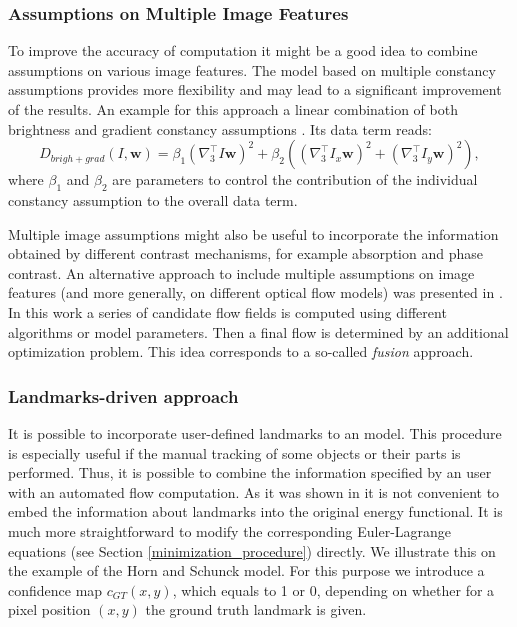 \subsubsection{Assumptions on Multiple Image Features}
\label{assumptions_on_multiple_image_features}

To improve the accuracy of \opticalflow computation it might be a good idea to combine assumptions on various image features. The model based on multiple constancy assumptions provides more flexibility and may lead to a significant improvement of the results. An example for this approach a linear combination of both brightness and gradient constancy assumptions \cite{Brox04, HarmonyFlow}. Its data term reads:
$$ D_{brigh+grad}(I,\textbf{w}) = \beta_{1}( \nabla_{3}^{\top}I \textbf{w})^2 + 
\beta_{2} ((\nabla_{3}^{\top}I_{x}\textbf{w})^2 + (\nabla_{3}^{\top}I_{y}\textbf{w})^2), $$
where $\beta_{1}$ and $\beta_{2}$ are parameters to control the contribution of the individual constancy assumption to the overall data term.

Multiple image assumptions might also be useful to incorporate the information obtained by different contrast mechanisms, for example absorption and phase contrast. An alternative approach to include multiple assumptions on image features (and more generally, on different optical flow models) was presented in \cite{Lempitsky08}. In this work a series of candidate flow fields is computed using different algorithms or model parameters. Then a final flow is determined by an additional optimization problem. This idea corresponds to a so-called \textit{fusion} approach. 


\subsubsection{Landmarks-driven approach}
\label{landmarks}


It is possible to incorporate user-defined landmarks to an \opticalflow model. This procedure is especially useful if the manual tracking of some objects or their parts is performed. Thus, it is possible to combine the  information specified by an user with an automated flow computation. As it was shown in \cite{Fischer03} it is not convenient to embed the information about landmarks into the original energy functional. It is much more straightforward to modify the corresponding Euler-Lagrange equations (see Section \ref{minimization_procedure}) directly. We illustrate this on the example of the Horn and Schunck model. 
For this purpose we introduce a confidence map $c_{GT}(x,y)$, which equals to 1 or 0, depending on whether for a pixel position $(x,y)$ the ground truth landmark is given.


